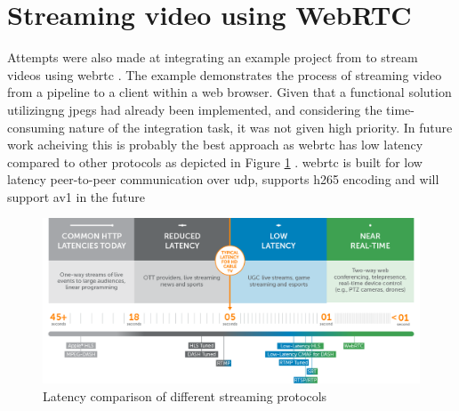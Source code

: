 \section{Streaming video using WebRTC}
Attempts were also made at integrating an example project from \gs  to stream videos using \gls{webrtc} \cite{gstreamerWebrtcMasterGStreamer2021}.
The example demonstrates the process of streaming video from a pipeline to a client within a web browser.
Given that a functional solution utilizingng \glspl{jpeg} had already been implemented, and considering the time-consuming nature of the integration task, it was not given high priority.
In future work acheiving this is probably the best approach as \gls{webrtc} has low latency compared to other protocols as depicted in Figure \ref{fig:streaming_latency} \cite{doughertyUltraLowLatency2022}.
\gls{webrtc} is built for low latency peer-to-peer communication over \gls{udp}, supports \gls{h265} encoding and will support \gls{av1} in the future \cite[1]{loretoRealTimeCommunicationWebRTC2014} \cite{ablyWebRTCVsWebSocket2023} \cite{mekyaFirstHEVC2652020}
\cite{red5proKeyReasonsAV12023}
\begin{figure}
    \centering
    \includegraphics[width=\textwidth]{figures/webrtc_latency.png}
    \caption{Latency comparison of different streaming protocols \cite{doughertyUltraLowLatency2022}}
    \label{fig:streaming_latency}
\end{figure}